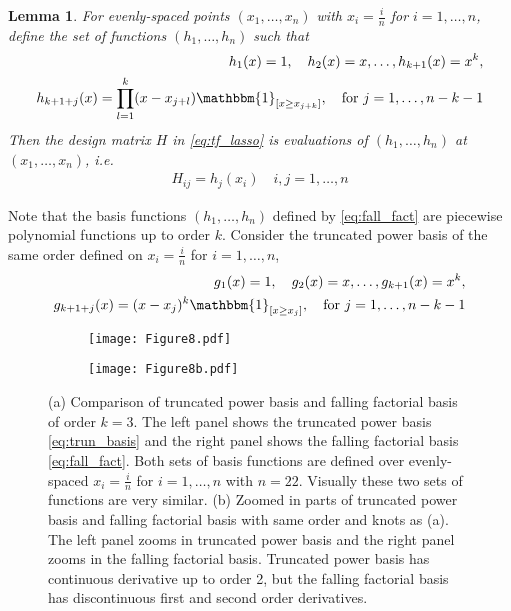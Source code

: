 \documentclass[a4paper]{article}
\newtheorem{lemma}[theorem]{Lemma}
\begin{document}
\begin{lemma}
For evenly-spaced points $(x_1,\ldots, x_n)$ with $x_i = \frac{i}{n}$ for $i=1,\ldots, n$, define the set of functions $(h_1, \ldots, h_n)$ such that
\begin{equation}
\begin{aligned}
h_1(x) = 1, \quad h_2(x) = x, \ldots, h_{k+1}(x) = x^k,\\
h_{k+1+j}(x) = \prod_{l=1}^k (x-x_{j+l})\mathbbm{1}_{[x\geq x_{j+k}]}, \quad \text{for } j = 1,\ldots, n-k-1
\label{eq:fall_fact}
\end{aligned}
\end{equation}
Then the design matrix $H$ in \eqref{eq:tf_lasso} is evaluations of $(h_1,\ldots, h_n)$ at $(x_1,\ldots, x_n)$, i.e.
\begin{align*}
H_{ij} = h_j(x_i) \quad i,j=1,\ldots, n
\end{align*}
\end{lemma}
Note that the basis functions $(h_1,\ldots, h_n)$ defined by \eqref{eq:fall_fact} are piecewise polynomial functions up to order $k$. Consider the truncated power basis of the same order defined on $x_i = \frac{i}{n}$ for $i= 1,\ldots, n$,
\begin{equation}
\begin{aligned}
g_1(x) = 1, \quad g_2(x) = x, \ldots, g_{k+1}(x) = x^k,\\
g_{k+1+j}(x) = (x-x_j)^k\mathbbm{1}_{[x\geq x_j]}, \quad \text{for }j=1,\ldots, n-k-1
\label{eq:trun_basis}
\end{aligned}
\end{equation}


\begin{figure}[t!]
\centering
   \begin{subfigure}[b]{1\textwidth}
   \texttt{[image: Figure8.pdf]}
   \caption{}
\end{subfigure}

\begin{subfigure}[b]{1\textwidth}
   \texttt{[image: Figure8b.pdf]}
   \caption{}
\end{subfigure}

\caption[Two numerical solutions]{(a) Comparison of truncated power basis and falling factorial basis of order $k=3$. The left panel shows the truncated power basis \eqref{eq:trun_basis} and the right panel shows the falling factorial basis \eqref{eq:fall_fact}. Both sets of basis functions are defined over evenly-spaced $x_i = \frac{i}{n}$ for $i=1,\ldots, n$ with $n = 22$. Visually these two sets of functions are very similar. (b) Zoomed in parts of truncated power basis and falling factorial basis with same order and knots as (a). The left panel zooms in truncated power basis and the right panel zooms in the falling factorial basis. Truncated power basis has continuous derivative up to order 2, but the falling factorial basis has discontinuous first and second order derivatives.}
\label{fig:Figure8_fall}
\end{figure}
\end{document}
